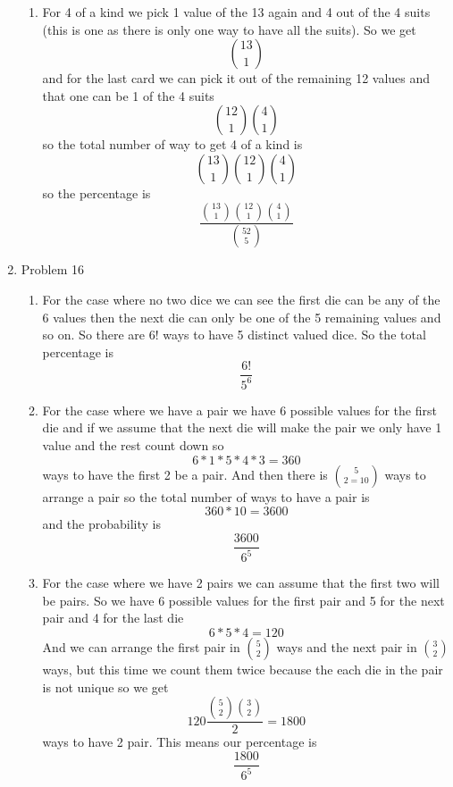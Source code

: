\documentclass[11pt]{article}
\begin{document}
\begin{enumerate}
\begin{enumerate}
\item
For 4 of a kind we pick 1 value of the 13 again and 4 out of the 4 suits (this is one as there is only one way to have all the suits). So we get
$$13\choose1$$
and for the last card we can pick it out of the remaining 12 values and that one can be 1 of the 4 suits
$${12\choose1}{4\choose1}$$
so the total number of way to get 4 of a kind is
$${13\choose1}{12\choose1}{4\choose1}$$
so the percentage is
$$\frac{{13\choose1}{12\choose1}{4\choose1}}{{52\choose5}}$$
\begin{center}
\end{center}

\end{enumerate}

\item Problem 16 
\begin{enumerate}
\item
For the case where no two dice we can see the first die can be any of the 6 values then the next die can only be one of the 5 remaining values and so on. So there are $6!$ ways to have 5 distinct valued dice.
So the total percentage is
$$\frac{6!}{5^6}$$
\begin{center}
\end{center}

\item
For the case where we have a pair we have 6 possible values for the first die and if we assume that the next die will make the pair we only have 1 value and the rest count down so
$$6*1*5*4*3 = 360$$ 
ways to have the first 2 be a pair. And then there is $5\choose2=10$ ways to arrange a pair so the total number of ways to have a pair is
$$360*10=3600$$
and the probability is
$$\frac{3600}{6^5}$$
\begin{center}
\end{center}

\item
For the case where we have 2 pairs we can assume that the first two will be pairs. So we have 6 possible values for the first pair and 5 for the next pair and 4 for the last die 
$$6*5*4 = 120$$ 	
And we can arrange the first pair in $5\choose2$ ways and the next pair in $3\choose2$ ways, but this time we count them twice because the each die in the pair is not unique so we get 
$$120\frac{{5\choose2}{3\choose2}}{2}=1800$$
ways to have 2 pair.
This means our percentage is
$$\frac{1800}{6^5}$$
\begin{center}
\end{center}


\end{enumerate}
\end{enumerate}
\end{document}
